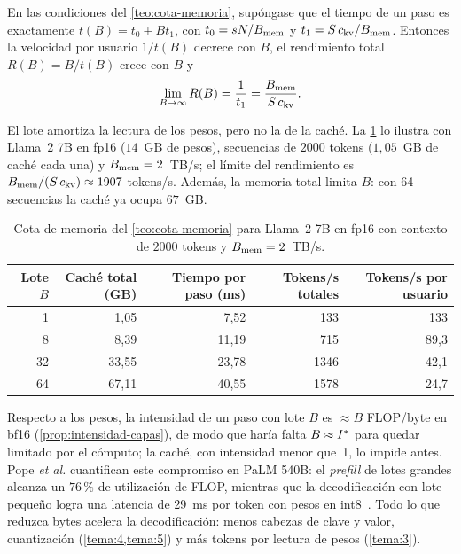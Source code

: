 \begin{proposicion}\label{prop:lote}
En las condiciones del \cref{teo:cota-memoria}, supóngase que el tiempo de un paso es exactamente $t(B)=t_0+Bt_1$, con $t_0=sN/B_{\mathrm{mem}}$ y $t_1=S\,c_{\mathrm{kv}}/B_{\mathrm{mem}}$. Entonces la velocidad por usuario $1/t(B)$ decrece con $B$, el rendimiento total $R(B)=B/t(B)$ crece con $B$ y
\[
\lim_{B\to\infty}R(B)=\frac{1}{t_1}=\frac{B_{\mathrm{mem}}}{S\,c_{\mathrm{kv}}}.
\]
\end{proposicion}

El lote amortiza la lectura de los pesos, pero no la de la caché. La \cref{tab:lote} lo ilustra con Llama~2 7B en fp16 ($14$~GB de pesos), secuencias de $2000$ tokens ($1{,}05$~GB de caché cada una) y $B_{\mathrm{mem}}=2$~TB/s; el límite del rendimiento es $B_{\mathrm{mem}}/(S\,c_{\mathrm{kv}})\approx 1907$ tokens/s. Además, la memoria total limita $B$: con 64 secuencias la caché ya ocupa $67$~GB.

\begin{table}[h]
\centering\small
\begin{tabular}{@{}rrrrr@{}}
\toprule
Lote $B$ & Caché total (GB) & Tiempo por paso (ms) & Tokens/s totales & Tokens/s por usuario \\
\midrule
1 & 1{,}05 & 7{,}52 & 133 & 133 \\
8 & 8{,}39 & 11{,}19 & 715 & 89{,}3 \\
32 & 33{,}55 & 23{,}78 & 1346 & 42{,}1 \\
64 & 67{,}11 & 40{,}55 & 1578 & 24{,}7 \\
\bottomrule
\end{tabular}
\caption{Cota de memoria del \cref{teo:cota-memoria} para Llama~2 7B en fp16 con contexto de $2000$ tokens y $B_{\mathrm{mem}}=2$~TB/s.}
\label{tab:lote}
\end{table}

\begin{observacion}
Respecto a los pesos, la intensidad de un paso con lote $B$ es $\approx B$ FLOP/byte en bf16 (\cref{prop:intensidad-capas}), de modo que haría falta $B\approx I^{\ast}$ para quedar limitado por el cómputo; la caché, con intensidad menor que~1, lo impide antes. Pope \emph{et al.} cuantifican este compromiso en PaLM 540B: el \emph{prefill} de lotes grandes alcanza un $76\,\%$ de utilización de FLOP, mientras que la decodificación con lote pequeño logra una latencia de 29~ms por token con pesos en int8~\cite{pope}. Todo lo que reduzca bytes acelera la decodificación: menos cabezas de clave y valor, cuantización (\cref{tema:4,tema:5}) y más tokens por lectura de pesos (\cref{tema:3}).
\end{observacion}

